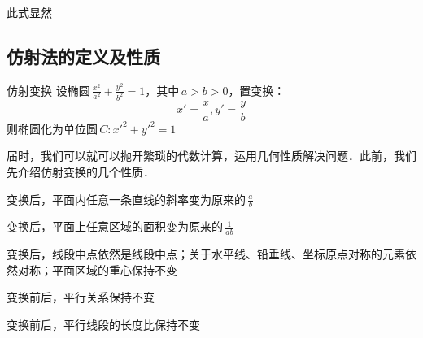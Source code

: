 此式显然
\subsection{仿射法的定义及性质}
\begin{definition}{仿射变换}
设椭圆\,\(\frac{x^2}{a^2}+\frac{y^2}{b^2}=1\)，其中\,\(a>b>0\)，置变换：
$$x'=\frac{x}{a},y'=\frac{y}{b}$$
则椭圆化为单位圆\,\(C:x'^2+y'^2=1\)
\end{definition}
届时，我们可以就可以抛开繁琐的代数计算，运用几何性质解决问题．此前，我们先介绍仿射变换的几个性质．
\begin{lemma}{}
变换后，平面内任意一条直线的斜率变为原来的\,\(\frac{a}{b}\)
\end{lemma}
\begin{lemma}{}
变换后，平面上任意区域的面积变为原来的\,\(\frac1{ab}\)
\end{lemma}
\begin{lemma}{}
变换后，线段中点依然是线段中点；关于水平线、铅垂线、坐标原点对称的元素依然对称；平面区域的重心保持不变
\end{lemma}
\begin{lemma}{}
变换前后，平行关系保持不变
\end{lemma}
\begin{lemma}{}
变换前后，平行线段的长度比保持不变
\end{lemma}
